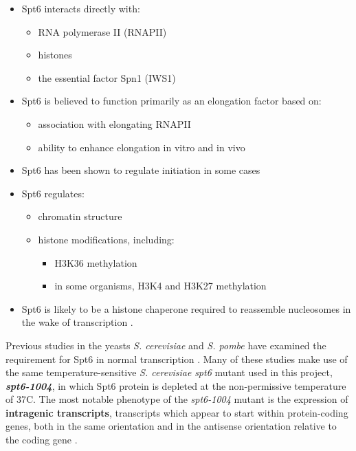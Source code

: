 \documentclass[10pt, letterpaper]{article}
\begin{document}
\begin{itemize}[nosep, topsep=.5em]
\item Spt6 interacts directly with:
	\begin{itemize}[nosep]
	\item RNA polymerase II (RNAPII) \cite{close2011, diebold2011, liu2011, sdano2017, sun2010, yoh2007}
	\item histones \cite{bortvin1996, mccullough2015}
	\item the essential factor Spn1 (IWS1) \cite{diebold2010b, li2018, mcdonald2010}
	\end{itemize}
\item Spt6 is believed to function primarily as an elongation factor based on:
	\begin{itemize}[nosep]
	\item association with elongating RNAPII \cite{andrulis2000, ivanovska2011, kaplan2000, mayer2010}
	\item ability to enhance elongation in vitro \cite{endoh2004} and in vivo \cite{ardehali2009}
	\end{itemize}
\item Spt6 has been shown to regulate initiation in some cases \cite{adkins2006, ivanovska2011}
\item Spt6 regulates:
	\begin{itemize}[nosep]
	\item chromatin structure \cite{bortvin1996, degennaro2013, ivanovska2011, jeronimo2015, kaplan2003, perales2013, vanbakel2013}
	\item histone modifications, including:
		\begin{itemize}[nosep]
		\item H3K36 methylation \cite{carrozza2005, chu2006, yoh2008, youdell2008}
		\item in some organisms, H3K4 and H3K27 methylation \cite{begum2012, chen2012, degennaro2013, wang2017, wang2013}
		\end{itemize}
	\end{itemize}
\item Spt6 is likely to be a histone chaperone required to reassemble nucleosomes in the wake of transcription \cite{duina2011}.
\end{itemize}

Previous studies in the yeasts \textit{S. cerevisiae} and \textit{S. pombe} have examined the requirement for Spt6 in normal transcription \cite{cheung2008, degennaro2013, kaplan2003, pathak2018, uwimana2017, vanbakel2013}. Many of these studies make use of the same temperature-sensitive \textit{S. cerevisiae} \textit{spt6} mutant used in this project, \textbf{\textit{spt6-1004}}, in which Spt6 protein is depleted at the non-permissive temperature of 37\textdegree C. The most notable phenotype of the \textit{spt6-1004} mutant is the expression of \textbf{intragenic transcripts}, transcripts which appear to start within protein-coding genes, both in the same orientation and in the antisense orientation relative to the coding gene \cite{cheung2008, degennaro2013, kaplan2003, uwimana2017}.
\end{document}
